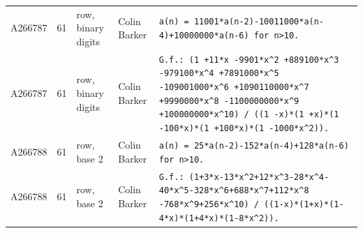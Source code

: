 \documentclass[11pt]{article}
\theoremstyle{definition}
\theoremstyle{remark}
\begin{document}
{\begin{longtable}{p{1.3cm}p{0.7cm}p{2.4cm}p{2.3cm}p{7.3cm}}
A266787 & 61 & row, binary digits & Colin Barker & \texttt{a(n)\allowbreak{} \allowbreak{}=\allowbreak{} \allowbreak{}11001*\allowbreak{}a(n-\allowbreak{}2)\allowbreak{}-\allowbreak{}10011000*\allowbreak{}a(n-\allowbreak{}4)\allowbreak{}+\allowbreak{}10000000*\allowbreak{}a(n-\allowbreak{}6)\allowbreak{} \allowbreak{}for \allowbreak{}n>10.} \\
A266787 & 61 & row, binary digits & Colin Barker & \texttt{G.f.: \allowbreak{}(1 \allowbreak{}+\allowbreak{}11*\allowbreak{}x \allowbreak{}-\allowbreak{}9901*\allowbreak{}x\^{}2 \allowbreak{}+\allowbreak{}889100*\allowbreak{}x\^{}3 \allowbreak{}-\allowbreak{}979100*\allowbreak{}x\^{}4 \allowbreak{}+\allowbreak{}7891000*\allowbreak{}x\^{}5 \allowbreak{}-\allowbreak{}109001000*\allowbreak{}x\^{}6 \allowbreak{}+\allowbreak{}1090110000*\allowbreak{}x\^{}7 \allowbreak{}+\allowbreak{}9990000*\allowbreak{}x\^{}8 \allowbreak{}-\allowbreak{}1100000000*\allowbreak{}x\^{}9 \allowbreak{}+\allowbreak{}100000000*\allowbreak{}x\^{}10)\allowbreak{} \allowbreak{}/\allowbreak{} \allowbreak{}((1 \allowbreak{}-\allowbreak{}x)\allowbreak{}*\allowbreak{}(1 \allowbreak{}+\allowbreak{}x)\allowbreak{}*\allowbreak{}(1 \allowbreak{}-\allowbreak{}100*\allowbreak{}x)\allowbreak{}*\allowbreak{}(1 \allowbreak{}+\allowbreak{}100*\allowbreak{}x)\allowbreak{}*\allowbreak{}(1 \allowbreak{}-\allowbreak{}1000*\allowbreak{}x\^{}2)\allowbreak{})\allowbreak{}.} \\
A266788 & 61 & row, base 2 & Colin Barker & \texttt{a(n)\allowbreak{} \allowbreak{}=\allowbreak{} \allowbreak{}25*\allowbreak{}a(n-\allowbreak{}2)\allowbreak{}-\allowbreak{}152*\allowbreak{}a(n-\allowbreak{}4)\allowbreak{}+\allowbreak{}128*\allowbreak{}a(n-\allowbreak{}6)\allowbreak{} \allowbreak{}for \allowbreak{}n>10.} \\
A266788 & 61 & row, base 2 & Colin Barker & \texttt{G.f.: \allowbreak{}(1+\allowbreak{}3*\allowbreak{}x-\allowbreak{}13*\allowbreak{}x\^{}2+\allowbreak{}12*\allowbreak{}x\^{}3-\allowbreak{}28*\allowbreak{}x\^{}4-\allowbreak{}40*\allowbreak{}x\^{}5-\allowbreak{}328*\allowbreak{}x\^{}6+\allowbreak{}688*\allowbreak{}x\^{}7+\allowbreak{}112*\allowbreak{}x\^{}8 \allowbreak{}-\allowbreak{}768*\allowbreak{}x\^{}9+\allowbreak{}256*\allowbreak{}x\^{}10)\allowbreak{} \allowbreak{}/\allowbreak{} \allowbreak{}((1-\allowbreak{}x)\allowbreak{}*\allowbreak{}(1+\allowbreak{}x)\allowbreak{}*\allowbreak{}(1-\allowbreak{}4*\allowbreak{}x)\allowbreak{}*\allowbreak{}(1+\allowbreak{}4*\allowbreak{}x)\allowbreak{}*\allowbreak{}(1-\allowbreak{}8*\allowbreak{}x\^{}2)\allowbreak{})\allowbreak{}.} \\

\end{longtable}}
\end{document}

